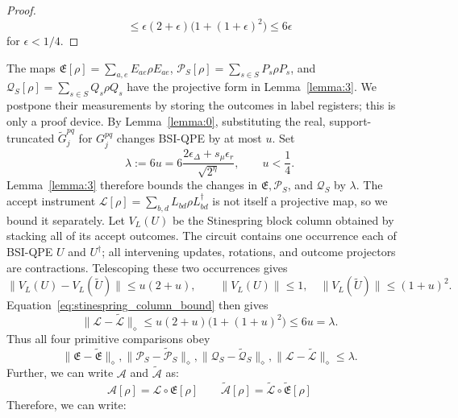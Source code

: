 \documentclass[aps,floatfix,10pt,amssymb,amsfont,amsmath,superscriptaddress,float,nofootinbib,longbibliography,nobalancelastpage,twocolumn]{revtex4-2}
\begin{document}
\begin{widetext}
\begin{proof}
\begin{equation*}
 \leq\epsilon(2+\epsilon)\bigl(1+(1+\epsilon)^2\bigr)
 \leq6\epsilon
\end{equation*}
for $\epsilon<1/4$.
\end{proof}
The maps
$\mathfrak{E}[\rho]=\sum_{a,e}E_{ae}\rho E_{ae}$,
$\mathcal P_S[\rho]=\sum_{s\in S}P_s\rho P_s$, and
$\mathcal Q_S[\rho]=\sum_{s\in S}Q_s\rho Q_s$ have the projective form
in Lemma~\ref{lemma:3}.  We postpone their measurements by storing the
outcomes in label registers; this is only a proof device.  By
Lemma~\ref{lemma:0}, substituting the real, support-truncated
$\tilde G_j^{pq}$ for $G_j^{pq}$ changes BSI-QPE by at most $u$.  Set
\begin{equation*}
 \lambda:=6u=6\frac{2\epsilon_\Delta+s_\mu\epsilon_r}{\sqrt{2^\eta}},
 \qquad u<\frac14 .
\end{equation*}
Lemma~\ref{lemma:3} therefore bounds the changes in
$\mathfrak E,\mathcal P_S$, and $\mathcal Q_S$ by $\lambda$.
The accept instrument
$\mathcal L[\rho]=\sum_{b,d}L_{bd}\rho L_{bd}^\dagger$ is not itself a
projective map, so we bound it separately.  Let $V_L(U)$ be the
Stinespring block column obtained by stacking all of its accept outcomes.
The circuit contains one occurrence each of BSI-QPE $U$ and $U^\dagger$;
all intervening updates, rotations, and outcome projectors are
contractions.  Telescoping these two occurrences gives
\begin{equation*}
 \|V_L(U)-V_L(\tilde U)\|\leq u(2+u),\qquad
 \|V_L(U)\|\leq1,\quad \|V_L(\tilde U)\|\leq(1+u)^2.
\end{equation*}
Equation~\eqref{eq:stinespring_column_bound} then gives
\begin{equation*}
 \|\mathcal L-\tilde{\mathcal L}\|_\diamond
 \leq u(2+u)\bigl(1+(1+u)^2\bigr)\leq6u=\lambda.
\end{equation*}
Thus all four primitive comparisons obey
\begin{equation}
    \|\mathfrak{E} - \tilde{\mathfrak{E}}\|_{\diamond},
    \|\mathcal{P}_S - \tilde{\mathcal{P}}_S\|_{\diamond},
    \|\mathcal{Q}_S - \tilde{\mathcal{Q}}_S\|_{\diamond},
    \|\mathcal{L} - \tilde{\mathcal{L}}\|_{\diamond}
    \leq\lambda .
\end{equation}
Further, we can write $\mathcal{A}$ and $\tilde{\mathcal{A}}$ as:
\begin{equation}
    \mathcal{A}[\rho] = \mathcal{L} \circ \mathfrak{E} [\rho] \qquad  \tilde{\mathcal{A}}[\rho] = \tilde{\mathcal{L}} \circ \tilde{\mathfrak{E}} [\rho]
\end{equation}
Therefore, we can write:

\end{widetext}
\end{document}
